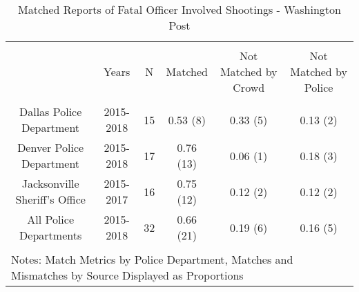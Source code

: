 
\begin{table}[!htbp] \centering 
  \caption{Matched Reports of Fatal Officer Involved Shootings - Washington Post} 
  \label{} 
\footnotesize 
\begin{tabular}{@{\extracolsep{5pt}} cccccc} 
\\[-1.8ex]\hline 
\hline \\[-1.8ex] 
 & Years & N & Matched & Not Matched by Crowd & Not Matched by Police \\ 
\hline \\[-1.8ex] 
Dallas Police Department & 2015-2018 & 15 & 0.53 (8) & 0.33 (5) & 0.13 (2) \\ 
Denver Police Department & 2015-2018 & 17 & 0.76 (13) & 0.06 (1) & 0.18 (3) \\ 
Jacksonville Sheriff's Office & 2015-2017 & 16 & 0.75 (12) & 0.12 (2) & 0.12 (2) \\ 
All Police Departments   & 2015-2018 & 32 & 0.66 (21) & 0.19 (6) & 0.16 (5) \\ 
\hline \\[-1.8ex] 
\multicolumn{6}{l}{Notes: Match Metrics by Police Department, Matches and Mismatches by Source Displayed as Proportions} \\ 
\end{tabular} 
\end{table}  
